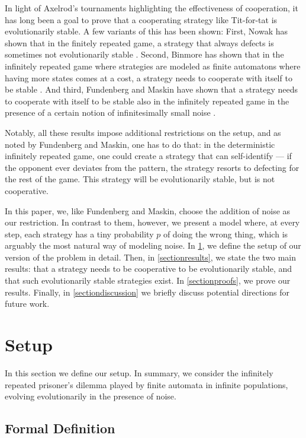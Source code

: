 \documentclass[11pt]{amsart}
\theoremstyle{definition}
\theoremstyle{remark}
\begin{document}
In light of Axelrod's tournaments highlighting the effectiveness of cooperation, it has long been a goal to prove that a cooperating strategy like Tit-for-tat is evolutionarily stable. A few variants of this has been shown: First, Nowak has shown that in the finitely repeated game, a strategy that always defects is sometimes not evolutionarily stable \cite{nowak2004emergence}. Second, Binmore has shown that in the infinitely repeated game where strategies are modeled as finite automatons where having more states comes at a cost, a strategy needs to cooperate with itself to be stable \cite{binmore1992evolutionary}. And third, Fundenberg and Maskin have shown that a strategy needs to cooperate with itself to be stable also in the infinitely repeated game in the presence of a certain notion of infinitesimally small noise \cite{fundenberg1990evolution}.

Notably, all these results impose additional restrictions on the setup, and as noted by Fundenberg and Maskin, one has to do that: in the deterministic infinitely repeated game, one could create a strategy that can self-identify — if the opponent ever deviates from the pattern, the strategy resorts to defecting for the rest of the game. This strategy will be evolutionarily stable, but is not cooperative. 

In this paper, we, like Fundenberg and Maskin, choose the addition of noise as our restriction. In contrast to them, however, we present a model where, at every step, each strategy has a tiny probability $p$ of doing the wrong thing, which is arguably the most natural way of modeling noise. In \cref{sectionsetup}, we define the setup of our version of the problem in detail. Then, in \cref{sectionresults}, we state the two main results: that a strategy needs to be cooperative to be evolutionarily stable, and that such evolutionarily stable strategies exist. In \cref{sectionproofs}, we prove our results. Finally, in \cref{sectiondiscussion} we briefly discuss potential directions for future work.

\section{Setup}
\label{sectionsetup}

In this section we define our setup. In summary, we consider the infinitely repeated prisoner's dilemma played by finite automata in infinite populations, evolving evolutionarily in the presence of noise.

\subsection{Formal Definition}
\end{document}
